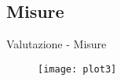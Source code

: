 \subsection{Misure}
\begin{frame}{Valutazione - Misure}
	\begin{figure}
	\texttt{[image: plot3]}
	\end{figure}
	
\end{frame}